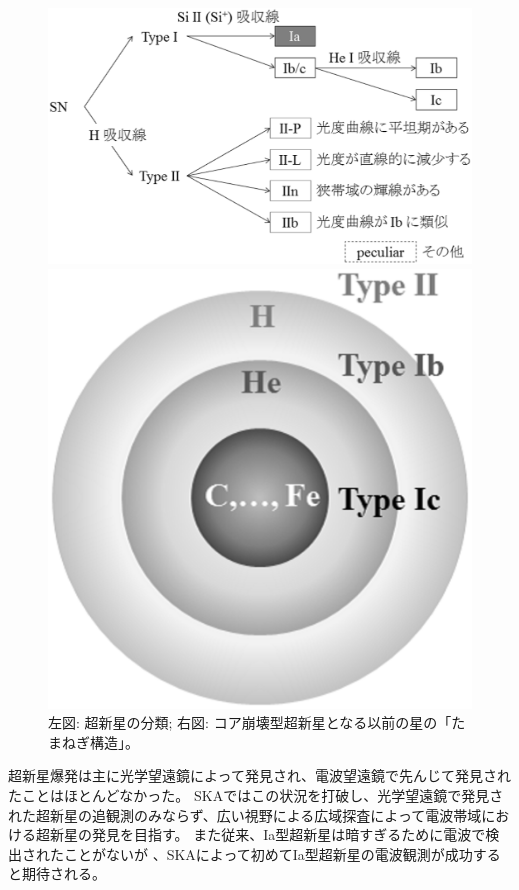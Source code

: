 \begin{figure}[]
	\begin{minipage}{0.6\textwidth}
		\centering
		\includegraphics[width=\linewidth,clip]{transients/transients.s1.sn-class.eps}
	\end{minipage}
	\begin{minipage}{0.4\textwidth}
		\centering
		\includegraphics[width=0.7\linewidth,clip]{transients/transients.s1.ccsn.eps}
	\end{minipage}
	\caption{左図: 超新星の分類; 右図: コア崩壊型超新星となる以前の星の「たまねぎ構造」。}
	\label{fig:transients.s1.sn}
\end{figure}%

超新星爆発は主に光学望遠鏡によって発見され、電波望遠鏡で先んじて発見されたことはほとんどなかった。
SKAではこの状況を打破し、光学望遠鏡で発見された超新星の追観測のみならず、広い視野による広域探査によって電波帯域における超新星の発見を目指す。
また従来、Ia型超新星は暗すぎるために電波で検出されたことがないが \citep{2012ApJ...750..164C}、SKAによって初めてIa型超新星の電波観測が成功すると期待される。

